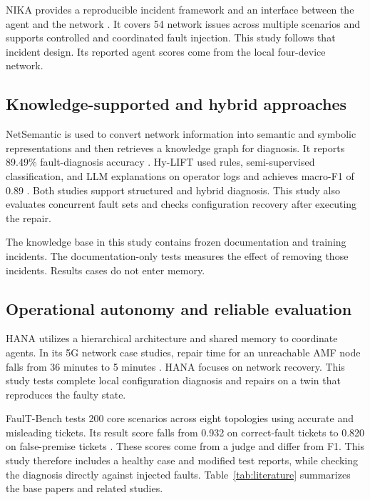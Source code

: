 \documentclass[pdflatex,sn-mathphys-num,iicol]{sn-jnl}
\begin{document}
NIKA provides a reproducible incident framework and an interface between the agent and the network \cite{nika,playground}. It covers 54 network issues across multiple scenarios and supports controlled and coordinated fault injection. This study follows that incident design. Its reported agent scores come from the local four-device network.

\subsection{Knowledge-supported and hybrid approaches}
NetSemantic is used to convert network information into semantic and symbolic representations and then retrieves a knowledge graph for diagnosis. It reports 89.49\% fault-diagnosis accuracy \cite{netsemantic}. Hy-LIFT used rules, semi-supervised classification, and LLM explanations on operator logs and achieves macro-F1 of 0.89 \cite{hylift}. Both studies support structured and hybrid diagnosis. This study also evaluates concurrent fault sets and checks configuration recovery after executing the repair.

The knowledge base in this study contains frozen documentation and training incidents. The documentation-only tests measures the effect of removing those incidents. Results cases do not enter memory.

\subsection{Operational autonomy and reliable evaluation}
HANA utilizes a hierarchical architecture and shared memory to coordinate agents. In its 5G network case studies, repair time for an unreachable AMF node falls from 36 minutes to 5 minutes \cite{hana}. HANA focuses on network recovery. This study tests complete local configuration diagnosis and repairs on a twin that reproduces the faulty state.

FaulT-Bench tests 200 core scenarios across eight topologies using accurate and misleading tickets. Its result score falls from 0.932 on correct-fault tickets to 0.820 on false-premise tickets \cite{faultbench}. These scores come from a judge and differ from F1. This study therefore includes a healthy case and modified test reports, while checking the diagnosis directly against injected faults. Table~\ref{tab:literature} summarizes the base papers and related studies.
\end{document}
